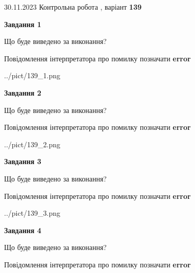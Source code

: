 \documentclass[12pt, ukrainian]{article}
\begin{document}
{{30.11.2023 Контрольна робота , варіант  \No \textbf { 139 }\par}}
{




{\begin {center}\textbf{Завдання 1}\end {center}}\par
Що буде виведено за виконання? \par
Повідомлення інтерпретатора про помилку позначати \textbf{error}

\begin{center}
	{../pict/139_1.png}
\end{center}
\newpage

{\begin {center}\textbf{Завдання 2}\end {center}}\par
Що буде виведено за виконання? \par
Повідомлення інтерпретатора про помилку позначати \textbf{error}

\begin{center}
	{../pict/139_2.png}
\end{center}
\newpage

{\begin {center}\textbf{Завдання 3}\end {center}}\par
Що буде виведено за виконання? \par
Повідомлення інтерпретатора про помилку позначати \textbf{error}

\begin{center}
	{../pict/139_3.png}
\end{center}
\newpage

{\begin {center}\textbf{Завдання 4}\end {center}}\par
Що буде виведено за виконання? \par
Повідомлення інтерпретатора про помилку позначати \textbf{error}

}
\end{document}
